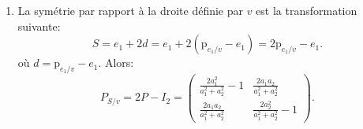 {\begin{td-sol}[]
\begin{enumerate}
\begin{equation*}
\begin{aligned}
\begin{pmatrix}
						a_1\\
						a_2
					\end{pmatrix}\\
					&= \frac{a_2}{a_1^2 + a_2^2} \begin{pmatrix}
						a_1\\
						a_2
					\end{pmatrix}
					= \begin{pmatrix}
						\frac{a_1 a_2}{a_1^2 + a_2^2}\\
						\frac{a_2^2}{a_1^2 + a_2^2}
					\end{pmatrix}.
				\end{aligned}
			\end{equation*}
			Enfin, on met le tout ensemble pour obtenir la matrice:
			\begin{equation*}
				P_{p/v} = 
				\begin{pmatrix}
					\frac{a_1^2}{a_1^2 + a_2^2} & \frac{a_1 a_2}{a_1^2 + a_2^2}\\
					\frac{a_1 a_2}{a_1^2 + a_2^2} & \frac{a_2^2}{a_1^2 + a_2^2}
				\end{pmatrix}
				= \frac{1}{a_1^2 + a_2^2}
				\begin{pmatrix}
					a_1^2 & a_1 a_2\\
					a_1 a_2 & a_2^2
				\end{pmatrix}.
			\end{equation*}

			\item La symétrie par rapport à la droite définie par \(v\) est la transformation
			suivante:
			\begin{equation*}
				S = e_1 + 2d = e_1 + 2(\text{p}_{e_1/v} - e_1) = 2\text{p}_{e_1/v} - e_1.
			\end{equation*}
			où \(d = \text{p}_{e_1/v} - e_1\). Alors:
			\begin{equation*}
				P_{S/v} = 2P - I_2 = 
				\begin{pmatrix}
					\frac{2a_1^2}{a_1^2 + a_2^2} - 1 & \frac{2a_1 a_2}{a_1^2 + a_2^2}\\
					\frac{2a_1 a_2}{a_1^2 + a_2^2} & \frac{2a_2^2}{a_1^2 + a_2^2} - 1
				\end{pmatrix}.
			\end{equation*}
		\end{enumerate}
	\end{td-sol}
}{}


